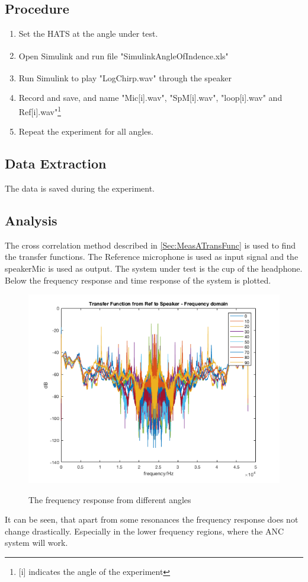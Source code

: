 \subsection{Procedure}
\begin{enumerate}
	\item Set the HATS at the angle under test. 
	\item Open Simulink\textsuperscript{\textregistered} and run file "SimulinkAngleOfIndence.xls"
	\item Run Simulink\textsuperscript{\textregistered} to play "LogChirp.wav" through the speaker
	\item Record and save, and name "Mic[i].wav", "SpM[i].wav", "loop[i].wav" and Ref[i].wav"\footnote{[i] indicates the angle of the experiment}
	\item Repeat the experiment for all angles.
\end{enumerate}

\subsection{Data Extraction}
The data is saved during the experiment.

\subsection{Analysis}
The cross correlation method described in \autoref{Sec:MeasATransFunc} is used to find the transfer functions. The Reference microphone is used as input signal and the speakerMic is used as output. The system under test is the cup of the headphone. 
Below the frequency response and time response of the system is plotted. 
\begin{figure}[H]
	\includegraphics[width=\textwidth]{../Journal/Experiments/AngleOfIncidence/TransRef2Speaker.png}
	\label{Fig:AngOfIncFreq}
	\caption{The frequency response from different angles}
\end{figure}
It can be seen, that apart from some resonances the frequency response does not change drastically. Especially in the lower frequency regions, where the ANC system will work. 


